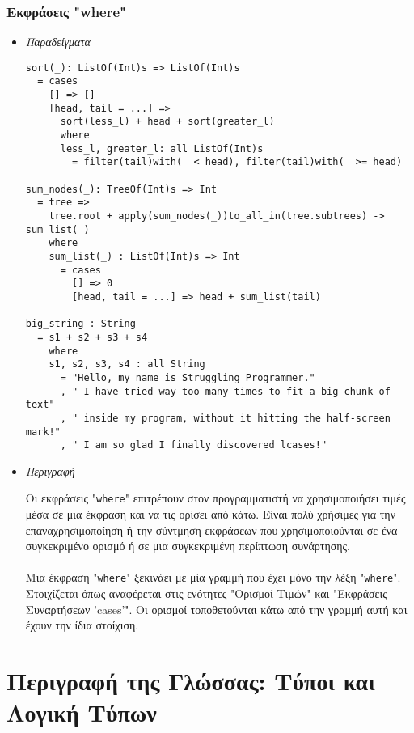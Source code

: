 \documentclass[diploma]{softlab-thesis}
\begin{document}
\newpage

\subsection{Εκφράσεις "where"}

\begin{itemize}

\item \textit{Παραδείγματα}
\begin{verbatim}
sort(_): ListOf(Int)s => ListOf(Int)s
  = cases
    [] => []
    [head, tail = ...] =>
      sort(less_l) + head + sort(greater_l)
      where
      less_l, greater_l: all ListOf(Int)s
        = filter(tail)with(_ < head), filter(tail)with(_ >= head)

sum_nodes(_): TreeOf(Int)s => Int
  = tree =>
    tree.root + apply(sum_nodes(_))to_all_in(tree.subtrees) -> sum_list(_)
    where
    sum_list(_) : ListOf(Int)s => Int
      = cases
        [] => 0
        [head, tail = ...] => head + sum_list(tail)

big_string : String
  = s1 + s2 + s3 + s4
    where
    s1, s2, s3, s4 : all String
      = "Hello, my name is Struggling Programmer."
      , " I have tried way too many times to fit a big chunk of text"
      , " inside my program, without it hitting the half-screen mark!"
      , " I am so glad I finally discovered lcases!"
\end{verbatim}

\item \textit{Περιγραφή}

Οι εκφράσεις "\verb|where|" επιτρέπουν στον προγραμματιστή να χρησιμοποιήσει
τιμές μέσα σε μια έκφραση και να τις ορίσει από κάτω. Είναι πολύ χρήσιμες
για την επαναχρησιμοποίηση ή την σύντμηση εκφράσεων που χρησιμοποιούνται
σε ένα συγκεκριμένο ορισμό ή σε μια συγκεκριμένη περίπτωση συνάρτησης.
\\\\
Μια έκφραση "\verb|where|" ξεκινάει με μία γραμμή που έχει μόνο την λέξη
"\verb|where|". Στοιχίζεται όπως αναφέρεται στις ενότητες "Ορισμοί Τιμών"
και "Εκφράσεις Συναρτήσεων 'cases'". Οι ορισμοί τοποθετούνται κάτω από
την γραμμή αυτή και έχουν την ίδια στοίχιση.

\end{itemize}

\chapter{Περιγραφή της Γλώσσας: Τύποι και Λογική Τύπων}
\end{document}
